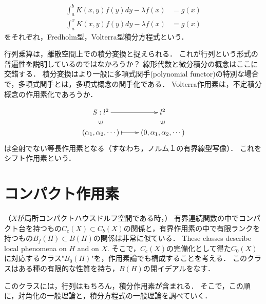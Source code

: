 \documentclass[uplatex,dvipdfmx]{jsreport}
\begin{document}
\begin{remark}
    \begin{align*}
        \int^b_aK(x,y)f(y)dy-\lambda f(x)&=g(x)\\
        \int^x_aK(x,y)f(y)dy-\lambda f(x)&=g(x)
    \end{align*}
    をそれぞれ，Fredholm型，Volterra型積分方程式という．
\end{remark}

\begin{example}
    行列乗算は，離散空間上での積分変換と捉えられる．
    これが行列という形式の普遍性を説明しているのではなかろうか？
    線形代数と微分積分の概念はここに交錯する．
    積分変換はより一般に多項式関手(polynomial functor)の特別な場合で，多項式関手とは，多項式概念の関手化である．
    Volterra作用素は，不定積分概念の作用素化であろうか．
\end{example}

\begin{example}\label{operator-unilateral-shift}
    \[\xymatrix@R-2pc{
        S:l^2\ar[r]&l^2\\
        \rotatebox[origin=c]{90}{$\in$}&\rotatebox[origin=c]{90}{$\in$}\\
        (\al_1,\al_2,\cdots)\ar@{|->}[r]&(0,\al_1,\al_2,\cdots)
    }\]
    は全射でない等長作用素となる（すなわち，ノルム１の有界線型写像）．
    これをシフト作用素という．
\end{example}


\section{コンパクト作用素}

\begin{tcolorbox}[colframe=ForestGreen, colback=ForestGreen!10!white,breakable,colbacktitle=ForestGreen!40!white,coltitle=black,fonttitle=\bfseries\sffamily,
title=]
    （$X$が局所コンパクトハウスドルフ空間である時，）
    有界連続関数の中でコンパクト台を持つもの$C_c(X)\subset C_b(X)$の関係と，有界作用素の中で有限ランクを持つもの$B_f(H)\subset B(H)$の関係は非常に似ている．
    These classes describe local phenomena on $H$ and on $X$.\cite{AnalysisNow}
    そこで，$C_c(X)$の完備化として得た$C_0(X)$に対応するクラス"$B_0(H)$"を，作用素論でも構成することを考える．
    このクラスはある種の有限的な性質を持ち，$B(H)$の閉イデアルをなす．

    このクラスには，行列はもちろん，積分作用素が含まれる．
    そこで，この順に，対角化の一般理論と，積分方程式の一般理論を調べていく．
\end{tcolorbox}
\end{document}
